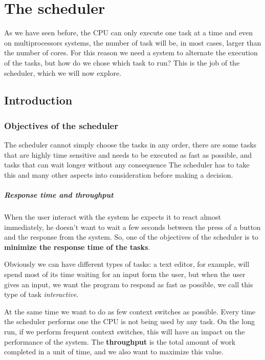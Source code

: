 \documentclass[10pt]{book}
\begin{document}
\chapter{The scheduler}
\label{ch:sched}

As we have seen before, the CPU can only execute one task at a time and even on multiprocessors systems, the number of task will be, in most cases, larger than the number of cores. For this reason we need a system to alternate the execution of the tasks, but how do we chose which task to run? This is the job of the scheduler, which we will now explore.

\section{Introduction}%

\subsection{Objectives of the scheduler}

The scheduler cannot simply choose the tasks in any order, there are some tasks that are highly time sensitive and needs to be executed as fast as possible, and tasks that can wait longer without any consequence The scheduler has to take this and many other aspects into consideration before making a decision.

\paragraph{Response time and throughput}
When the user interact with the system he expects it to react almost immediately, he doesn't want to wait a few seconds between the press of a button and the response from the system. So, one of the objectives of the scheduler is to \textbf{minimize the response time of the tasks}. 

Obviously we can have different types of tasks: a text editor, for example, will spend most of its time waiting for an input form the user, but when the user gives an input, we want the program to respond as fast as possible, we call this type of task \textit{interactive}.

At the same time we want to do as few context switches as possible. Every time the scheduler performs one the CPU is not being used by any task. On the long run, if we perform frequent context switches, this will have an impact on the performance of the system. The \textbf{throughput} is the total amount of work completed in a unit of time, and we also want to maximize this value.
\end{document}
